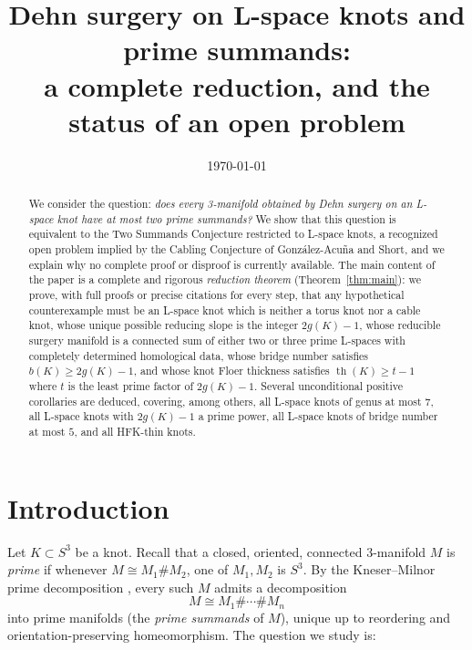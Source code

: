 \documentclass[11pt]{amsart}
\theoremstyle{definition}
\theoremstyle{remark}
\numberwithin{equation}{section}
\begin{document}
\title{Dehn surgery on L-space knots and prime summands:\\
a complete reduction, and the status of an open problem}

\author{}
\date{\today}

\begin{abstract}
We consider the question: \emph{does every 3-manifold obtained by Dehn
surgery on an L-space knot have at most two prime summands?} We show that
this question is equivalent to the Two Summands Conjecture restricted to
L-space knots, a recognized open problem implied by the Cabling Conjecture
of Gonz\'alez-Acu\~na and Short, and we explain why no complete proof or
disproof is currently available. The main content of the paper is a
complete and rigorous \emph{reduction theorem} (Theorem~\ref{thm:main}):
we prove, with full proofs or precise citations for every step, that any
hypothetical counterexample must be an L-space knot which is neither a
torus knot nor a cable knot, whose unique possible reducing slope is the
integer $2g(K)-1$, whose reducible surgery manifold is a connected sum of
either two or three prime L-spaces with completely determined homological
data, whose bridge number satisfies $b(K)\ge 2g(K)-1$, and whose knot Floer
thickness satisfies $\operatorname{th}(K)\ge t-1$ where $t$ is the least
prime factor of $2g(K)-1$. Several unconditional positive corollaries are
deduced, covering, among others, all L-space knots of genus at most $7$,
all L-space knots with $2g(K)-1$ a prime power, all L-space knots of
bridge number at most $5$, and all HFK-thin knots.
\end{abstract}

\maketitle

\section{Introduction}\label{sec:intro}

Let $K\subset S^{3}$ be a knot. Recall that a closed, oriented, connected
$3$-manifold $M$ is \emph{prime} if whenever $M\cong M_{1}\#M_{2}$, one of
$M_{1},M_{2}$ is $S^{3}$. By the Kneser--Milnor prime decomposition
\cite{Hempel}, every such $M$ admits a decomposition
\[
M\cong M_{1}\#\cdots\# M_{n}
\]
into prime manifolds (the \emph{prime summands} of $M$), unique up to
reordering and orientation-preserving homeomorphism. The question we study
is:
\end{document}

